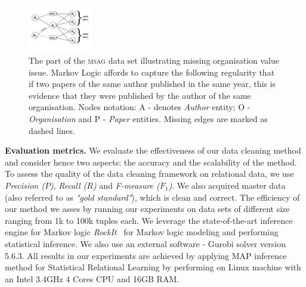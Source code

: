 \begin{figure}[t]
    \centering
    \includegraphics[width=0.25\textwidth, trim = 0mm 4mm 0mm 5mm, clip]{img/graph01.png}
    \caption{The part of the \textsc{msag} data set illustrating missing organisation value issue. Markov Logic affords to capture the following regularity that if two papers of the same author published in the same year, this is evidence that they were published by the author of the same organisation. Nodes notation: A - denotes \textit{Author} entity; O - \textit{Organisation} and P - \textit{Paper} entities. Missing edges are marked as dashed lines.}
    \label{fig:msagmissing}
\end{figure}

\textbf{Evaluation metrics.} We evaluate the effectiveness of our data cleaning method and consider hence two aspects: the accuracy and the scalability of the method. To assess the quality of the data cleaning framework on relational data, we use \textit{Precision ($P$)}, \textit{Recall ($R$)} and \textit{F-measure ($F_1$)}. We also acquired master data (also referred to as \textit{"gold standard"}), which is clean and correct. The efficiency of our method we asses by running our experiments on data sets of different size ranging from 1k to 100k tuples each. We leverage the state-of-the-art inference engine for Markov logic \textit{RockIt}~\cite{NoessnerNS13} for Markov logic modeling and performing statistical inference. We also use an external software - Gurobi solver version 5.6.3. All results in our experiments are achieved by applying MAP inference method for Statistical Relational Learning by performing on Linux machine with an Intel 3.4GHz 4 Cores CPU and 16GB RAM.





